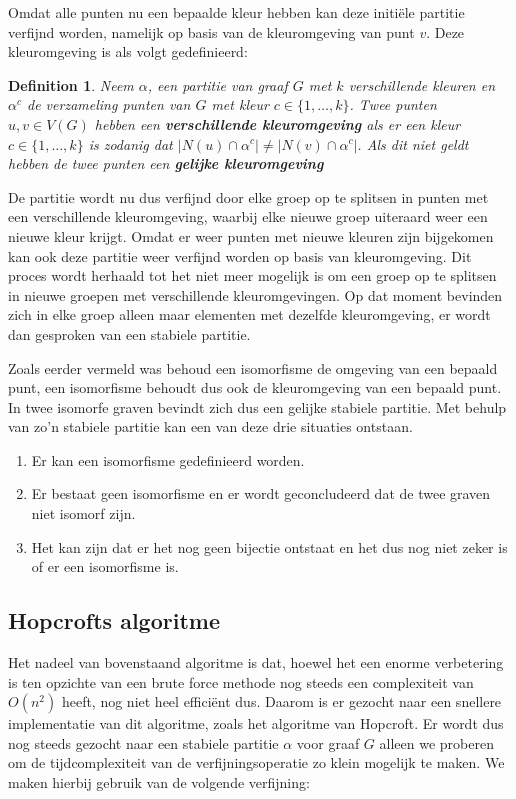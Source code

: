 \documentclass[twoside]{article}
\newtheorem{definition}{Definition}[section]
\begin{document}
\begin{multicols}{2}
Omdat alle punten nu een bepaalde kleur hebben kan deze initi\"ele partitie verfijnd worden, namelijk op basis van de kleuromgeving van punt $v$. Deze kleuromgeving is als volgt gedefinieerd:

\begin{definition}
Neem $\alpha$, een partitie van graaf $G$ met $k$ verschillende kleuren en  $\alpha^{c}$ de verzameling punten van $G$ met kleur $c \in \{1,\ldots,k\}$. Twee punten $u,v \in V(G)$ hebben een \textbf{verschillende kleuromgeving} als er een kleur $c \in \{1,\ldots,k\}$ is zodanig dat $|N(u)\cap\alpha^{c}| \neq |N(v)\cap\alpha^{c}|$. Als dit niet geldt hebben de twee punten een \textbf{gelijke kleuromgeving}
\cite{slides_DFA}
\end{definition}


De partitie wordt nu dus verfijnd door elke groep op te splitsen in punten met een verschillende kleuromgeving, waarbij elke nieuwe groep uiteraard weer een nieuwe kleur krijgt. Omdat er weer punten met nieuwe kleuren zijn bijgekomen kan ook deze partitie weer verfijnd worden op basis van kleuromgeving. Dit proces wordt herhaald tot het niet meer mogelijk is om een groep op te splitsen in nieuwe groepen met verschillende kleuromgevingen. Op dat moment bevinden zich in elke groep alleen maar elementen met dezelfde kleuromgeving, er wordt dan gesproken van een stabiele partitie.

Zoals eerder vermeld was behoud een isomorfisme de omgeving van een bepaald punt, een isomorfisme behoudt dus ook de kleuromgeving van een bepaald punt. In twee isomorfe graven bevindt zich dus een gelijke stabiele partitie. Met behulp van zo'n stabiele partitie kan een van deze drie situaties ontstaan.
\begin{enumerate}
\item Er kan een isomorfisme gedefinieerd worden.
\item Er bestaat geen isomorfisme en er wordt geconcludeerd dat  de twee graven niet isomorf zijn.
\item Het kan zijn dat er het nog geen bijectie ontstaat en het dus nog niet zeker is of er een isomorfisme is.
\end{enumerate}

\subsection{Hopcrofts algoritme}
Het nadeel van bovenstaand algoritme is dat, hoewel het een enorme verbetering is ten opzichte van een brute force methode nog steeds een complexiteit van $O(n^2)$ heeft, nog niet heel effici\"ent dus. Daarom is er gezocht naar een snellere implementatie van dit algoritme, zoals het algoritme van Hopcroft. Er wordt dus nog steeds gezocht naar een stabiele partitie $\alpha$ voor graaf $G$ alleen we proberen om de tijdcomplexiteit van de verfijningsoperatie zo klein mogelijk te maken. We maken hierbij gebruik van de volgende verfijning:


\end{multicols}
\end{document}
